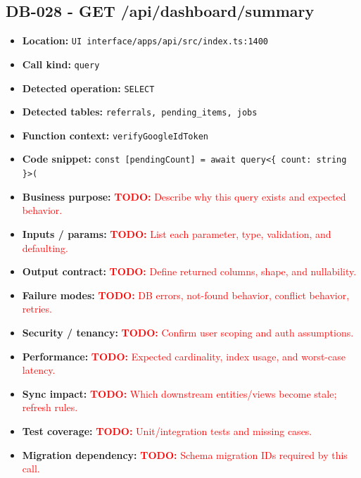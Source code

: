 \documentclass[11pt]{article}
\newcommand{\todoitem}[1]{\textcolor{red}{\textbf{TODO:} #1}}
\begin{document}
\subsection{DB-028 - GET /api/dashboard/summary}
\begin{itemize}[leftmargin=1.5em]
\item \textbf{Location:} \texttt{UI interface/apps/api/src/index.ts:1400}
\item \textbf{Call kind:} \texttt{query}
\item \textbf{Detected operation:} \texttt{SELECT}
\item \textbf{Detected tables:} \texttt{referrals, pending\_items, jobs}
\item \textbf{Function context:} \texttt{verifyGoogleIdToken}
\item \textbf{Code snippet:} \texttt{const [pendingCount] = await query<\{ count: string \}>(}
\item \textbf{Business purpose:} \todoitem{Describe why this query exists and expected behavior.}
\item \textbf{Inputs / params:} \todoitem{List each parameter, type, validation, and defaulting.}
\item \textbf{Output contract:} \todoitem{Define returned columns, shape, and nullability.}
\item \textbf{Failure modes:} \todoitem{DB errors, not-found behavior, conflict behavior, retries.}
\item \textbf{Security / tenancy:} \todoitem{Confirm user scoping and auth assumptions.}
\item \textbf{Performance:} \todoitem{Expected cardinality, index usage, and worst-case latency.}
\item \textbf{Sync impact:} \todoitem{Which downstream entities/views become stale; refresh rules.}
\item \textbf{Test coverage:} \todoitem{Unit/integration tests and missing cases.}
\item \textbf{Migration dependency:} \todoitem{Schema migration IDs required by this call.}
\end{itemize}
\end{document}
